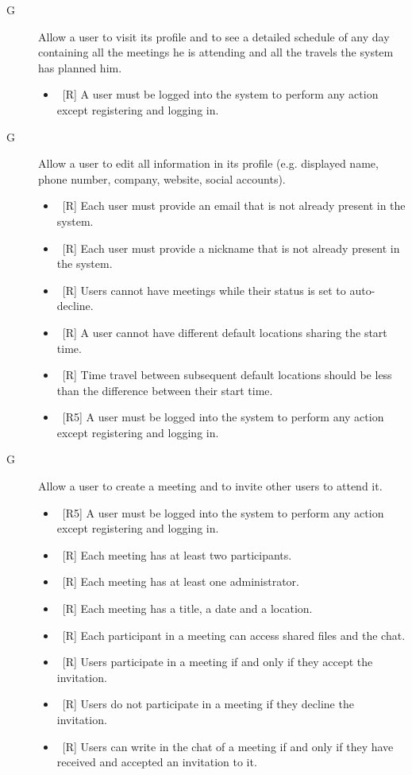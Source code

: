 \begin{description}
\item[G\thecountGoal] Allow a user to visit its profile and to see a detailed schedule of any day containing all the meetings he is attending and all the travels the system has planned him.

\begin{itemize}
\item~[R\reqNum] A user must be logged into the system to perform any action except registering and logging in.
\end{itemize}


\item[G\thecountGoal] Allow a user to edit all information in its profile (e.g. displayed name, phone number, company, website, social accounts).

\begin{itemize}
\item~[R\reqNum] Each user must provide an email that is not already present in the system.
\item~[R\reqNum] Each user must provide a nickname that is not already present in the system.
\item~[R\reqNum] Users cannot have meetings while their status is set to auto-decline.
\item~[R\reqNum] A user cannot have different default locations sharing the start time.
\item~[R\reqNum] Time travel between subsequent default locations should be less than the difference between their start time.
\item~[R5] A user must be logged into the system to perform any action except registering and logging in.
\end{itemize}

\item[G\thecountGoal] Allow a user to create a meeting and to invite other users to attend it.

\begin{itemize}
\item~[R5] A user must be logged into the system to perform any action except registering and logging in.
\item~[R\reqNum] Each meeting has at least two participants.
\item~[R\reqNum] Each meeting has at least one administrator.
\item~[R\reqNum] Each meeting has a title, a date and a location.
\item~[R\reqNum] Each participant in a meeting can access shared files and the chat.
\item~[R\reqNum] Users participate in a meeting if and only if they accept the invitation.
\item~[R\reqNum] Users do not participate in a meeting if they decline the invitation.
\item~[R\reqNum] Users can write in the chat of a meeting if and only if they have received and accepted an invitation to it.
\end{itemize}


\end{description}
